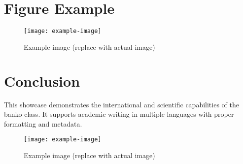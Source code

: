\documentclass{banko}
\begin{document}
	\section{Figure Example}
	\begin{figure}[h!]
		\centering
		\texttt{[image: example-image]}
		\caption{Example image (replace with actual image)}
	\end{figure}
	
	\section{Conclusion}
	This showcase demonstrates the international and scientific capabilities of the {banko} class. It supports academic writing in multiple languages with proper formatting and metadata.
	
	
	
	\begin{figure*}
		\centering
		\texttt{[image: example-image]}
		\caption{Example image (replace with actual image)}
	\end{figure*}
	
	\lipsum[1-10]
	
\end{document}
